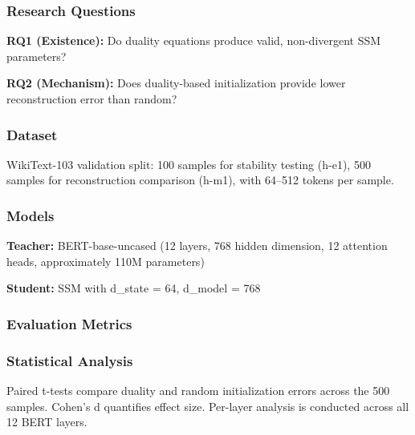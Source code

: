 
\subsubsection{Research Questions}

\textbf{RQ1 (Existence):} Do duality equations produce valid, non-divergent SSM parameters?

\textbf{RQ2 (Mechanism):} Does duality-based initialization provide lower reconstruction error than random?

\subsubsection{Dataset}

WikiText-103 \citep{merity2017wikitext} validation split: 100 samples for stability testing (h-e1), 500 samples for reconstruction comparison (h-m1), with 64--512 tokens per sample.

\subsubsection{Models}

\textbf{Teacher:} BERT-base-uncased (12 layers, 768 hidden dimension, 12 attention heads, approximately 110M parameters)

\textbf{Student:} SSM with d\_state = 64, d\_model = 768

\subsubsection{Evaluation Metrics}

\begin{table}[htbp]
\centering
{}
\end{table}

\subsubsection{Statistical Analysis}

Paired t-tests compare duality and random initialization errors across the 500 samples. Cohen's d quantifies effect size. Per-layer analysis is conducted across all 12 BERT layers.
